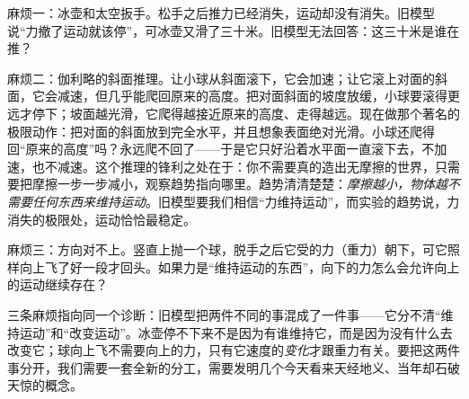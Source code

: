 麻烦一：冰壶和太空扳手。松手之后推力已经消失，运动却没有消失。旧模型说“力撤了运动就该停”，可冰壶又滑了三十米。旧模型无法回答：这三十米是谁在推？

麻烦二：伽利略的斜面推理。让小球从斜面滚下，它会加速；让它滚上对面的斜面，它会减速，但几乎能爬回原来的高度。把对面斜面的坡度放缓，小球要滚得更远才停下；坡面越光滑，它爬得越接近原来的高度、走得越远。现在做那个著名的极限动作：把对面的斜面放到完全水平，并且想象表面绝对光滑。小球还爬得回“原来的高度”吗？永远爬不回了——于是它只好沿着水平面一直滚下去，不加速，也不减速。这个推理的锋利之处在于：你不需要真的造出无摩擦的世界，只需要把摩擦一步一步减小，观察趋势指向哪里。趋势清清楚楚：\emph{摩擦越小，物体越不需要任何东西来维持运动}。旧模型要我们相信“力维持运动”，而实验的趋势说，力消失的极限处，运动恰恰最稳定。

麻烦三：方向对不上。竖直上抛一个球，脱手之后它受的力（重力）朝下，可它照样向上飞了好一段才回头。如果力是“维持运动的东西”，向下的力怎么会允许向上的运动继续存在？

三条麻烦指向同一个诊断：旧模型把两件不同的事混成了一件事——它分不清“维持运动”和“改变运动”。冰壶停不下来不是因为有谁维持它，而是因为没有什么去改变它；球向上飞不需要向上的力，只有它速度的\emph{变化}才跟重力有关。要把这两件事分开，我们需要一套全新的分工，需要发明几个今天看来天经地义、当年却石破天惊的概念。


